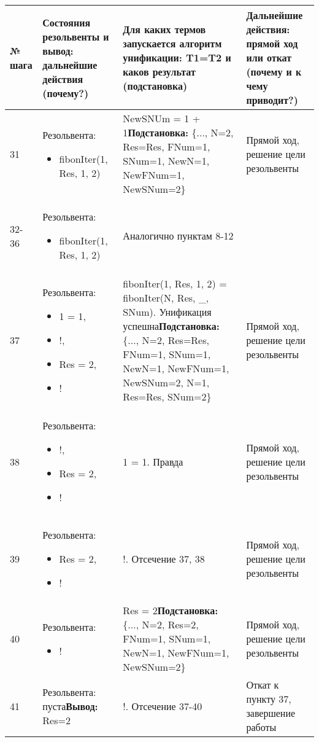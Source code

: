 \documentclass[14pt,a4paper]{scrreprt}
\begin{document}
\begin{table}[H]
	\begin{tabular}{|p{0.8cm\small}|p{4.7cm\small}|p{5.7cm\small}|p{4cm\small}|}	
		\hline
		№ шага & Состояния резольвенты и вывод: дальнейшие действия (почему?) & Для каких термов запускается алгоритм унификации: T1=T2 и каков результат (подстановка) & Дальнейшие действия: прямой ход или откат (почему и к чему приводит?)\\
		\hline
		31 & Резольвента:\begin{itemize} \item fibonIter(1, Res, 1, 2)\end{itemize} & NewSNUm = 1 + 1\linebreak \textbf{Подстановка:} \{..., N=2, Res=Res, FNum=1, SNum=1, NewN=1, NewFNum=1, NewSNum=2\} & Прямой ход, решение цели резольвенты\\
		\hline
		32-36 & Резольвента:\begin{itemize} \item fibonIter(1, Res, 1, 2)\end{itemize} & Аналогично пунктам 8-12 & \\
		\hline
		37 & Резольвента:\begin{itemize} \item 1 = 1, \item !, \item Res = 2, \item !\end{itemize} & fibonIter(1, Res, 1, 2) = fibonIter(N, Res, \_, SNum). Унификация успешна\linebreak \textbf{Подстановка:} \{..., N=2, Res=Res, FNum=1, SNum=1, NewN=1, NewFNum=1, NewSNum=2, N=1, Res=Res, SNum=2\} & Прямой ход, решение цели резольвенты\\
		\hline
		38 & Резольвента:\begin{itemize} \item !, \item Res = 2, \item !\end{itemize} & 1 = 1. Правда & Прямой ход, решение цели резольвенты\\
		\hline
		39 & Резольвента:\begin{itemize} \item Res = 2, \item !\end{itemize} & !. Отсечение 37, 38 & Прямой ход, решение цели резольвенты\\
		\hline
		40 & Резольвента:\begin{itemize} \item !\end{itemize} & Res = 2\linebreak \textbf{Подстановка:} \{..., N=2, Res=2, FNum=1, SNum=1, NewN=1, NewFNum=1, NewSNum=2\} & Прямой ход, решение цели резольвенты\\
		\hline
		41 & Резольвента: пуста\linebreak \textbf{Вывод:} Res=2 & !. Отсечение 37-40 & Откат к пункту 37, завершение работы\\
		\hline
	\end{tabular}
\end{table}
		
\end{document}
